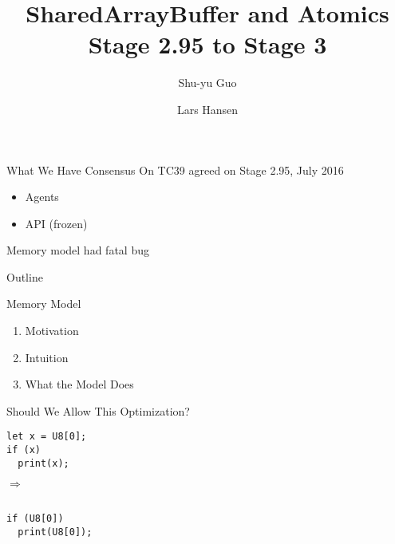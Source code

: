 \documentclass[notes]{beamer}
\title[SAB MM]{SharedArrayBuffer and Atomics \\ Stage 2.95 to Stage 3}
\author{Shu-yu Guo \and Lars Hansen}
\institute[Mozilla]{Mozilla}
\begin{document}
\begin{frame}[plain]
  \titlepage
\end{frame}

\begin{frame}{What We Have Consensus On}
  TC39 agreed on Stage 2.95, July 2016
  \begin{itemize}
  \item Agents
  \item API (frozen)
  \end{itemize}

  \pause

  \begin{center}
    \huge Memory model had fatal bug
  \end{center}

\end{frame}

\begin{frame}{Outline}
  \begin{center}
    Memory Model
  \end{center}

  \begin{enumerate}
  \item Motivation
  \item Intuition
  \item What the Model Does
  \end{enumerate}
\end{frame}

\begin{frame}[fragile]{Should We Allow This Optimization?}
    \begin{minipage}{.45\textwidth}
      \begin{lstlisting}
let x = U8[0];
if (x)
  print(x);
      \end{lstlisting}
    \end{minipage}%
    \hfill$\Rightarrow$\hfill
    \begin{minipage}{.45\textwidth}
      \begin{lstlisting}

if (U8[0])
  print(U8[0]);
      \end{lstlisting}
    \end{minipage}

\end{frame}
\end{document}
